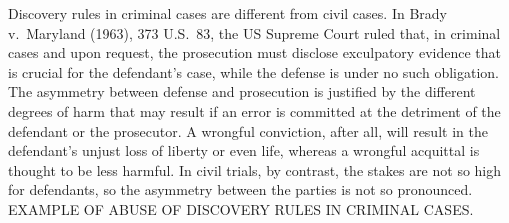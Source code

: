 \documentclass[10pt]{article}
\begin{document}



 
Discovery rules in criminal cases are different from civil cases. 
In Brady v.\ Maryland (1963), 373 U.S.\ 83, the US Supreme Court ruled that, in criminal cases and upon request, the prosecution must 
disclose exculpatory evidence that is crucial for the defendant's case, while the defense is under no such obligation.
The asymmetry between defense and prosecution is justified by the different degrees of harm that may result if an error is committed at the detriment of the defendant or the prosecutor. A wrongful conviction, after all, will result  
in the defendant's unjust loss of liberty or even life, whereas a wrongful acquittal 
is thought to be less harmful. In civil trials, by contrast, the stakes are not so high for defendants, 
so the asymmetry between the parties is not so pronounced.
EXAMPLE OF ABUSE OF DISCOVERY RULES IN CRIMINAL CASES.

%
%
\end{document}
